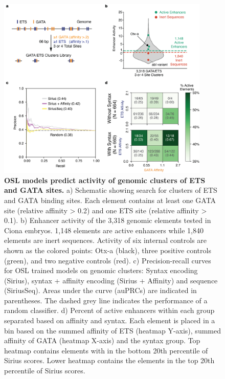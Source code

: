\begin{figure}[p]
    \centering
    \includegraphics[width=0.9\textwidth, height=0.745\textheight]{2_figures-and-files/Fig5.png}
    \caption[OSL models predict activity of genomic clusters of ETS and GATA sites.]{\textbf{OSL models predict activity of genomic clusters of ETS and GATA sites.} a) Schematic showing search for clusters of ETS and GATA binding sites. Each element contains at least one GATA site (relative affinity > 0.2) and one ETS site (relative affinity > 0.1). b) Enhancer activity of the 3,318 genomic elements tested in Ciona embryos. 1,148 elements are active enhancers while 1,840 elements are inert sequences. Activity of six internal controls are shown as the colored points: Otx-a (black), three positive controls (green), and two negative controls (red). c) Precision-recall curves for OSL trained models on genomic clusters: Syntax encoding (Sirius), syntax + affinity encoding (Sirius + Affinity) and sequence (SiriusSeq). Areas under the curve (auPRCs) are indicated in parentheses. The dashed grey line indicates the performance of a random classifier. d) Percent of active enhancers within each group separated based on affinity and syntax. Each element is placed in a bin based on the summed affinity of ETS (heatmap Y-axis), summed affinity of GATA (heatmap X-axis) and the syntax group. Top heatmap contains elements with in the bottom 20th percentile of Sirius scores. Lower heatmap contains the elements in the top 20th percentile of Sirius scores.}
    \label{fig:2 Figure 5}
\end{figure}

